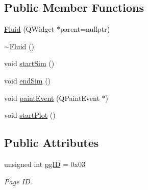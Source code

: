 \subsection*{Public Member Functions}
\begin{DoxyCompactItemize}
\item 
\mbox{\hyperlink{classFluid_af73b49dddf652b62f3cb78e400c09446}{Fluid}} (Q\+Widget $\ast$parent=nullptr)
\item 
\mbox{\hyperlink{classFluid_af461f45faf49d13c195739a57ab7814a}{$\sim$\+Fluid}} ()
\item 
void \mbox{\hyperlink{classFluid_af249a75d7ef113842c226b8b939c8f90}{start\+Sim}} ()
\item 
void \mbox{\hyperlink{classFluid_a92695db4868e8b2ec1bf4649ce5a9d19}{end\+Sim}} ()
\item 
void \mbox{\hyperlink{classFluid_a9f4b99a8c95a81cce3c0463607a997bb}{paint\+Event}} (Q\+Paint\+Event $\ast$)
\item 
void \mbox{\hyperlink{classFluid_ae7c7a362e1c6fcf2c88bfbf8f1836a52}{start\+Plot}} ()
\end{DoxyCompactItemize}
\subsection*{Public Attributes}
\begin{DoxyCompactItemize}
\item 
unsigned int \mbox{\hyperlink{classFluid_a6a918fd3756b078ac094010cf5215f90}{pg\+ID}} = 0x03
\begin{DoxyCompactList}\small\item\em Page ID. \end{DoxyCompactList}\end{DoxyCompactItemize}
